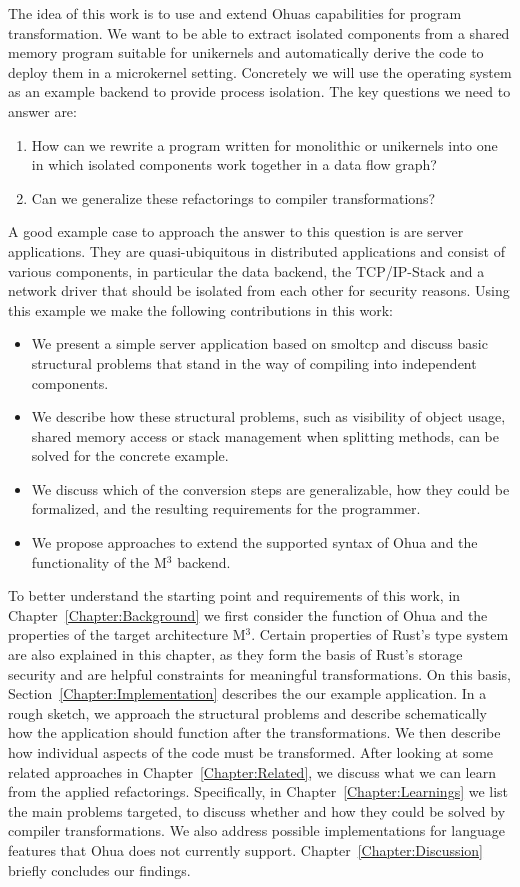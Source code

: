 The idea of this work is to use and extend Ohuas capabilities for program transformation. We want to be able to extract isolated components from a shared memory program suitable for unikernels and automatically derive the code to deploy them in a microkernel setting. Concretely we will use the \md operating system as an example backend to provide process isolation. The key questions we need to answer are:
\begin{enumerate}
    \item[] How can we rewrite a program written for monolithic or unikernels into one in which isolated components work together in a data flow graph?
    \item[] Can we generalize these refactorings to compiler transformations?
\end{enumerate}

A good example case to approach the answer to this question is are server applications. They are quasi-ubiquitous in distributed applications and consist of various components, in particular the data backend, the TCP/IP-Stack and a network driver that should be isolated from each other for security reasons. Using this example we make the following contributions in this work:

\begin{itemize}
    \item We present a simple server application based on smoltcp and discuss basic structural problems that stand in the way of compiling into independent components.
    \item We describe how these structural problems, such as visibility of object usage, shared memory access or stack management when splitting methods, can be solved for the concrete example.
    \item We discuss which of the conversion steps are generalizable, how they could be formalized, and the resulting requirements for the programmer.
    \item We propose approaches to extend the supported syntax of Ohua and the functionality of the M$^3$ backend.  
\end{itemize}


To better understand the starting point and requirements of this work, in Chapter~\ref{Chapter:Background} we first consider the function of Ohua and the properties of the target architecture M$^3$. Certain properties of Rust's type system are also explained in this chapter, as they form the basis of Rust's storage security and are helpful constraints for meaningful transformations. On this basis, Section~\ref{Chapter:Implementation} describes the our example application. In a rough sketch, we approach the structural problems and describe schematically how the application should function after the transformations. We then describe how individual aspects of the code must be transformed. After looking at some related approaches in Chapter~\ref{Chapter:Related}, we discuss what we can learn from the applied refactorings. Specifically, in Chapter~\ref{Chapter:Learnings} we list the main problems targeted, to discuss whether and how they could be solved by compiler transformations. We also address possible implementations for language features that Ohua does not currently support. Chapter~\ref{Chapter:Discussion} briefly concludes our findings. 